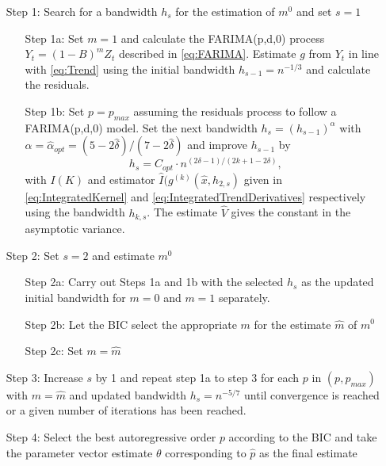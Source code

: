 \documentclass[12pt]{article}
\begin{document}
	\begin{enumerate}[leftmargin=1.5cm,itemsep=0mm]
		\label{alg:1}
		\item[Step 1:] Search for a bandwidth \( h_s \) for the estimation of \(m^{0}\) and set \(s=1\)
		\begin{enumerate}
			\item[Step 1a:] Set \(m = 1\) and calculate the FARIMA(p,d,0) process \(Y_{t} = (1-B)^{m}Z_t\) described in \eqref{eq:FARIMA}. Estimate \(g\) from \(Y_t\) in line with \eqref{eq:Trend} using the initial bandwidth \(h_{s-1} = n^{-1/3}\) and calculate the residuals.
			\item[Step 1b:] Set \(p = p_{max}\) assuming the residuals process to follow a FARIMA(p,d,0) model. Set the next bandwidth \(h_{s} = (h_{s-1})^{\alpha}\) with \(\alpha = \hat{\alpha}_{opt} = (5-2\hat{\delta})/(7-2\hat{\delta})\) and improve \(h_{s-1}\) by 
			\begin{equation}
			\label{eq:Bandwidth}
			h_{s} = C_{opt}
			\cdot n^{(2\delta-1)/(2k+1-2\delta)},
			\end{equation}
			with  \(I(K)\) and estimator \(\hat{I}(g^{(k)}(\hat{x},h_{2,s})\) given in \eqref{eq:IntegratedKernel} and \eqref{eq:IntegratedTrendDerivatives} respectively using the bandwidth \(h_{k,s}\). The estimate \(\hat{V}\) gives the constant in the asymptotic variance. 
		\end{enumerate}
		\item[Step 2:] Set \(s=2\) and estimate \(m^{0}\)
		\begin{enumerate}
			\item[Step 2a:] Carry out Steps 1a and 1b with the selected \(h_s\) as the updated initial bandwidth for  \(m = 0\) and \(m = 1\)  separately. 
			\item[Step 2b:] Let the BIC select the appropriate \(m\) for the estimate \(\hat{m}\) of \(m^{0}\)
			\item[Step 2c:] Set \(m = \hat{m}\)
		\end{enumerate}
		\item[Step 3:] Increase \(s\) by 1 and repeat step 1a to step 3 for each \(p\) in \((p,p_{max})\) with \(m = \hat{m}\) and updated bandwidth \(h_{s} = n^{-5/7}\) until convergence is reached or a given number of iterations has been reached.
		\item[Step 4:] Select the best autoregressive order \(p\) according to the BIC and take the parameter vector estimate \(\theta\) corresponding to \(\hat{p}\) as the final estimate
	\end{enumerate}
\end{document}
